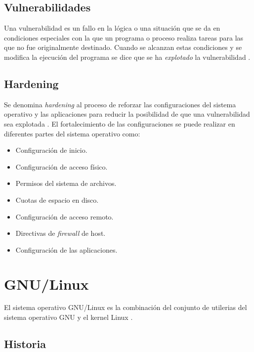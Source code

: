   \subsection {Vulnerabilidades}

Una vulnerabilidad es un fallo en la l\'{o}gica o una situaci\'{o}n que se da en condiciones especiales con la que un programa o proceso realiza tareas para las que no fue originalmente destinado. Cuando se alcanzan estas condiciones y se modifica la ejecuci\'{o}n del programa se dice que se ha \textit{explotado} la vulnerabilidad \cite{padilla_buenas_2009}.

  \subsection {Hardening}

Se denomina \textit{hardening} al proceso de reforzar las configuraciones del sistema operativo y las aplicaciones para reducir la posibilidad de que una vulnerabilidad sea explotada \cite{padilla_buenas_2009}. El fortalecimiento de las configuraciones se puede realizar en diferentes partes del sistema operativo como:

\begin{itemize}
  \item Configuraci\'{o}n de inicio.
  \item Configuraci\'{o}n de acceso f\'{i}sico.
  \item Permisos del sistema de archivos.
  \item Cuotas de espacio en disco.
  \item Configuraci\'{o}n de acceso remoto.
  \item Directivas de \textit{firewall} de host.
  \item Configuraci\'{o}n de las aplicaciones.
\end{itemize}

\newpage
\section {GNU/Linux}

El sistema operativo GNU/Linux es la combinaci\'{o}n del conjunto de utilerias del sistema operativo GNU y el kernel Linux \cite{_linux_????}.


  \subsection {Historia}

